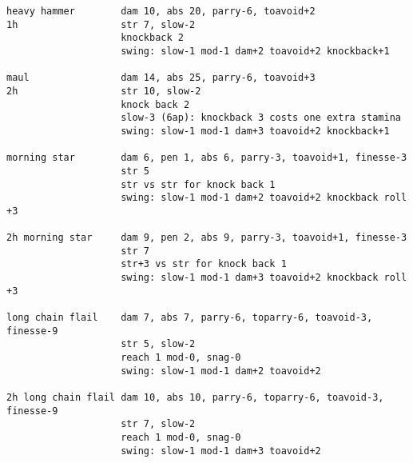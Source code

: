 \begin{verbatim}
heavy hammer        dam 10, abs 20, parry-6, toavoid+2
1h                  str 7, slow-2
                    knockback 2
                    swing: slow-1 mod-1 dam+2 toavoid+2 knockback+1

maul                dam 14, abs 25, parry-6, toavoid+3
2h                  str 10, slow-2
                    knock back 2
                    slow-3 (6ap): knockback 3 costs one extra stamina
                    swing: slow-1 mod-1 dam+3 toavoid+2 knockback+1

morning star        dam 6, pen 1, abs 6, parry-3, toavoid+1, finesse-3
                    str 5
                    str vs str for knock back 1
                    swing: slow-1 mod-1 dam+2 toavoid+2 knockback roll +3

2h morning star     dam 9, pen 2, abs 9, parry-3, toavoid+1, finesse-3
                    str 7
                    str+3 vs str for knock back 1
                    swing: slow-1 mod-1 dam+3 toavoid+2 knockback roll +3

long chain flail    dam 7, abs 7, parry-6, toparry-6, toavoid-3, finesse-9
                    str 5, slow-2
                    reach 1 mod-0, snag-0
                    swing: slow-1 mod-1 dam+2 toavoid+2

2h long chain flail dam 10, abs 10, parry-6, toparry-6, toavoid-3, finesse-9
                    str 7, slow-2
                    reach 1 mod-0, snag-0
                    swing: slow-1 mod-1 dam+3 toavoid+2

\end{verbatim}
\normalsize






